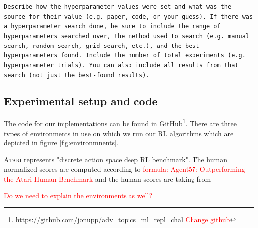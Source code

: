 \documentclass[10pt]{article} %
\begin{document}
\texttt{Describe how the hyperparameter values were set and what was the source for their value (e.g. paper, code, or your guess). If there was a hyperparameter search done, be sure to include the range of hyperparameters searched over, the method used to search (e.g. manual search, random search, grid search, etc.), and the best hyperparameters found. Include the number of total experiments (e.g. hyperparameter trials). You can also include all results from that search (not just the best-found results).}

\hypertarget{experimental-setup}{\subsection{Experimental setup and code}}

\noindent The code for our implementations can be found in GitHub\footnote{\href{https://github.com/jonupp/adv_topics_ml_repl_chal}{https://github.com/jonupp/adv\_topics\_ml\_repl\_chal} \textcolor{red}{Change github}}. There are three types of environments in use on which we run our RL algorithms which are depicted in figure \ref{fig:environmnents}. 

\noindent \textsc{Atari} represents "discrete action space deep RL benchmark". The human normalized scores are computed according to \textcolor{red}{formula: Agent57: Outperforming the Atari Human Benchmark} and the human scores are taking from

\noindent \textcolor{red}{Do we need to explain the environments as well?}
\end{document}
